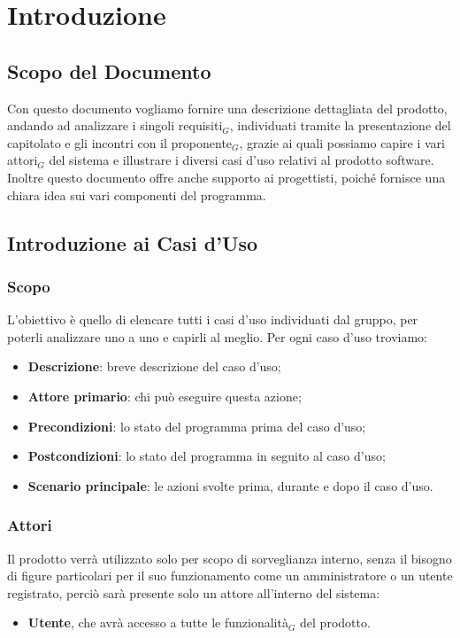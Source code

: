 \chapter{Introduzione}

\section{Scopo del Documento}
Con questo documento vogliamo fornire una descrizione dettagliata del prodotto, andando ad analizzare i singoli
requisiti$_G$, individuati tramite la presentazione del capitolato e gli incontri con il proponente$_G$, grazie ai quali
possiamo capire i vari attori$_G$ del sistema e illustrare i diversi casi d'uso relativi al prodotto software.
\newline
Inoltre questo documento offre anche supporto ai progettisti, poiché fornisce una chiara idea sui vari componenti del programma.

\section{Introduzione ai Casi d'Uso}
\subsection{Scopo}
L'obiettivo è quello di elencare tutti i casi d'uso individuati dal gruppo, per poterli analizzare uno a uno e capirli al meglio.
\newline
Per ogni caso d'uso troviamo:
\begin{itemize}
  \item \textbf{Descrizione}: breve descrizione del caso d'uso;
  \item \textbf{Attore primario}: chi può eseguire questa azione;
  \item \textbf{Precondizioni}: lo stato del programma prima del caso d'uso;
  \item \textbf{Postcondizioni}: lo stato del programma in seguito al caso d'uso;
  \item \textbf{Scenario principale}: le azioni svolte prima, durante e dopo il caso d'uso.
\end{itemize}

\subsection{Attori}
Il prodotto verrà utilizzato solo per scopo di sorveglianza interno, senza il bisogno di figure particolari per il suo funzionamento
come un amministratore o un utente registrato, perciò sarà presente solo un attore all'interno del sistema:
\begin{itemize}
  \item \textbf{Utente}, che avrà accesso a tutte le funzionalità$_G$ del prodotto.
\end{itemize}

